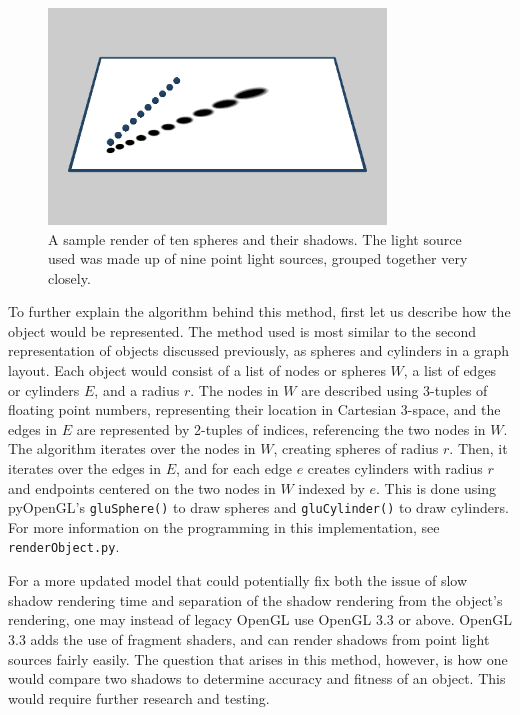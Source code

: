 \documentclass[10pt]{article}
\begin{document}
\begin{figure}[ht]
    \centering
    \includegraphics[width=0.8\textwidth]{object-render3.png}
    \caption{A sample render of ten spheres and their shadows.  The light source used was made up of nine point light sources, grouped together very closely.}
    \label{fig:render_3}
\end{figure}

To further explain the algorithm behind this method, first let us describe how the object would be represented.  The method used is most similar to the second representation of objects discussed previously, as spheres and cylinders in a graph layout.  Each object would consist of a list of nodes or spheres $W$, a list of edges or cylinders $E$, and a radius $r$.  The nodes in $W$ are described using 3-tuples of floating point numbers, representing their location in Cartesian 3-space, and the edges in $E$ are represented by 2-tuples of indices, referencing the two nodes in $W$.  The algorithm iterates over the nodes in $W$, creating spheres of radius $r$.  Then, it iterates over the edges in $E$, and for each edge $e$ creates cylinders with radius $r$ and endpoints centered on the two nodes in $W$ indexed by $e$.  This is done using pyOpenGL's \texttt{gluSphere()} to draw spheres and \texttt{gluCylinder()} to draw cylinders.  For more information on the programming in this implementation, see \texttt{renderObject.py}.\cite{gitrepo}

For a more updated model that could potentially fix both the issue of slow shadow rendering time and separation of the shadow rendering from the object's rendering, one may instead of legacy OpenGL use OpenGL 3.3 or above.  OpenGL 3.3 adds the use of fragment shaders, and can render shadows from point light sources fairly easily.  The question that arises in this method, however, is how one would compare two shadows to determine accuracy and fitness of an object.  This would require further research and testing.
\end{document}
